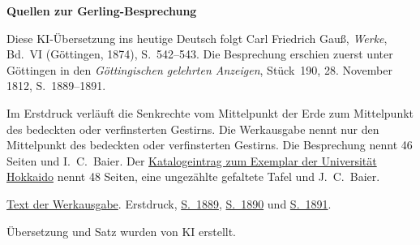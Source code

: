 \clearpage\thispagestyle{empty}
\begin{center}\textbf{Quellen zur Gerling-Besprechung}\end{center}
\noindent Diese KI-Übersetzung ins heutige Deutsch folgt Carl Friedrich Gauß, \textit{Werke}, Bd.~VI (Göttingen, 1874), S.~542--543. Die Besprechung erschien zuerst unter Göttingen in den \textit{Göttingischen gelehrten Anzeigen}, Stück~190, 28. November 1812, S.~1889--1891.
\par\smallskip\noindent Im Erstdruck verläuft die Senkrechte vom Mittelpunkt der Erde zum Mittelpunkt des bedeckten oder verfinsterten Gestirns. Die Werkausgabe nennt nur den Mittelpunkt des bedeckten oder verfinsterten Gestirns. Die Besprechung nennt 46 Seiten und I.~C.~Baier. Der \href{https://ci.nii.ac.jp/ncid/BD21343055}{Katalogeintrag zum Exemplar der Universität Hokkaido} nennt 48 Seiten, eine ungezählte gefaltete Tafel und J.~C.~Baier.
\par\smallskip\noindent \href{https://gdz.sub.uni-goettingen.de/id/PPN236007467}{Text der Werkausgabe}. Erstdruck, \href{https://images.p.sub.uni-goettingen.de/iiif/image/gdz:PPN319721507_1812:00001933/full/1650,/0/default.jpg}{S.~1889}, \href{https://images.p.sub.uni-goettingen.de/iiif/image/gdz:PPN319721507_1812:00001934/full/1650,/0/default.jpg}{S.~1890} und \href{https://images.p.sub.uni-goettingen.de/iiif/image/gdz:PPN319721507_1812:00001935/full/1650,/0/default.jpg}{S.~1891}.
\par\smallskip\noindent Übersetzung und Satz wurden von KI erstellt.
\clearpage
